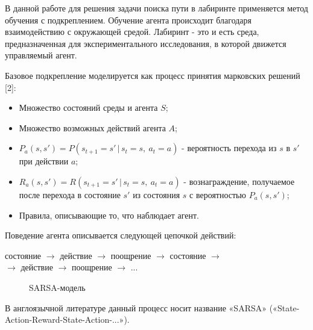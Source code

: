 \documentclass[a4paper]{report}
\theoremstyle{definition}
\theoremstyle{plain}
\theoremstyle{remark}
\theoremstyle{remark}
\theoremstyle{definition}
\begin{document}
В данной работе для решения задачи поиска пути в лабиринте применяется метод обучения с подкреплением. Обучение агента происходит благодаря взаимодействию с окружающей средой. Лабиринт - это и есть среда, предназначенная для экспериментального исследования, в которой движется управляемый агент.

Базовое подкрепление моделируется как процесс принятия марковских решений [2]:

\begin{itemize}
 	\item Множество состояний среды и агента $S$;
 	\item Множество возможных действий агента $A$;
 	\item $P_a(s, s') = P(s_{t+1}=s'\,|\,s_t=s,\:a_t=a)$ - вероятность перехода из $s$ в $s'$ при действии $a$;
 	\item $R_a(s, s') = R(s_{t+1}=s'\,|\,s_t=s,\:a_t=a)$ - вознаграждение, получаемое после перехода в состояние $s'$ из состояния $s$ с вероятностью $P_a(s,s')$;
 	\item Правила, описывающие то, что наблюдает агент.
\end{itemize}

Поведение агента описывается следующей цепочкой действий:
\begin{center}
состояние $\rightarrow$ действие
$\rightarrow$ поощрение $\rightarrow$ состояние $\rightarrow$ \\
$\rightarrow$ действие $\rightarrow$ поощрение $\rightarrow$ ... 
\end{center}

\begin{figure}[H]
	\caption{SARSA-модель}
\end{figure}

В англоязычной литературе данный процесс носит название «SARSA» («State-Action-Reward-State-Action-...»).
\end{document}
